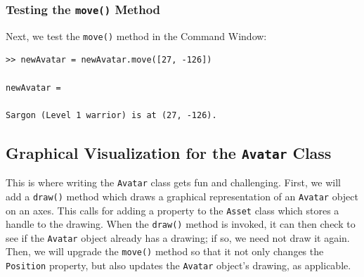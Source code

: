 \subsubsection{Testing the \texttt{move()} Method}
Next, we test the \texttt{move()} method in the Command Window:
\begin{lstlisting}[style=Matlab-editor, label=AvatarClassDefTestCmdWin02, caption={The \texttt{Avatar} class \texttt{move()} method worked as desired in a Command Window test.}]
>> newAvatar = newAvatar.move([27, -126])

newAvatar = 

Sargon (Level 1 warrior) is at (27, -126).
\end{lstlisting}

\subsection{Graphical Visualization for the \texttt{Avatar} Class}

This is where writing the \texttt{Avatar} class gets fun and challenging. First, we will add a \texttt{draw()} method which draws a graphical representation of an \texttt{Avatar} object on an axes. This calls for adding a property to the \texttt{Asset} class which stores a handle to the drawing. When the \texttt{draw()} method is invoked, it can then check to see if the \texttt{Avatar} object already has a drawing; if so, we need not draw it again. Then, we will upgrade the \texttt{move()} method so that it not only changes the \texttt{Position} property, but also updates the \texttt{Avatar} object's drawing, as applicable.

